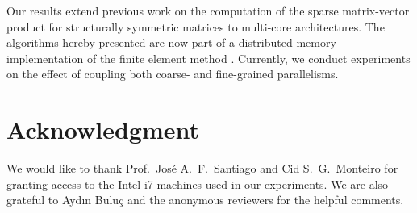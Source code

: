 \documentclass[11pt]{article}
\begin{document}
Our results extend previous work
on the computation of the sparse matrix-vector product for
structurally symmetric matrices to multi-core
architectures.
The algorithms hereby presented are now part of a distributed-memory implementation
of the finite element method \cite{RF07a}.
Currently,
we conduct experiments on the effect of coupling both coarse- and fine-grained parallelisms.

\section*{Acknowledgment}

We would like to thank Prof.~Jos{\'e} A.~F.~Santiago and Cid S.~G.~Monteiro for
granting access to the Intel i7 machines used in our experiments. We are also
grateful to Ayd{\i}n Bulu\c{c} and the anonymous reviewers
for the helpful comments.



\end{document}
